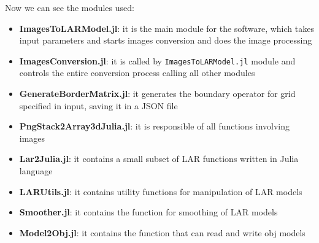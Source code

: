 Now we can see the modules used:
\begin{itemize}
 \item \textbf{ImagesToLARModel.jl}: it is the main module for the software, which takes input parameters and starts images conversion and does the image processing
 \item \textbf{ImagesConversion.jl}: it is called by \texttt{ImagesToLARModel.jl} module and controls the entire conversion process calling all other modules
 \item \textbf{GenerateBorderMatrix.jl}: it generates the boundary operator for grid specified in input, saving it in a JSON file
 \item \textbf{PngStack2Array3dJulia.jl}: it is responsible of all functions involving images
 \item \textbf{Lar2Julia.jl}: it contains a small subset of LAR functions written in Julia language
 \item \textbf{LARUtils.jl}: it contains utility functions for manipulation of LAR models
 \item \textbf{Smoother.jl}: it contains the function for smoothing of LAR models
 \item \textbf{Model2Obj.jl}: it contains the function that can read and write obj models
\end{itemize}
